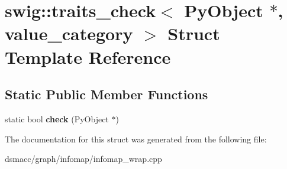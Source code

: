 \hypertarget{structswig_1_1traits__check_3_01PyObject_01_5_00_01value__category_01_4}{}\section{swig\+:\+:traits\+\_\+check$<$ Py\+Object $\ast$, value\+\_\+category $>$ Struct Template Reference}
\label{structswig_1_1traits__check_3_01PyObject_01_5_00_01value__category_01_4}
\subsection*{Static Public Member Functions}
\begin{DoxyCompactItemize}
\item 
\mbox{\label{structswig_1_1traits__check_3_01PyObject_01_5_00_01value__category_01_4_a4242a4f3371216574fd46f69b5fa0a23}} 
static bool {\bfseries check} (Py\+Object $\ast$)
\end{DoxyCompactItemize}


The documentation for this struct was generated from the following file\+:\begin{DoxyCompactItemize}
\item 
dsmacc/graph/infomap/infomap\+\_\+wrap.\+cpp\end{DoxyCompactItemize}
